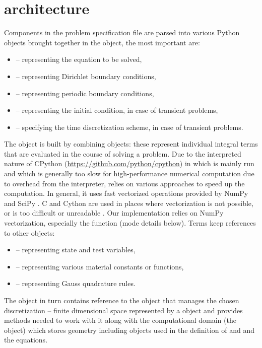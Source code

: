 \section{\sfepy{} architecture}
Components in the problem specification file are parsed into various
Python
objects
brought together in the  object, the most important
are:
\begin{itemize}
    \item {} -- representing the equation to be solved,
    \item {} -- representing Dirichlet boundary conditions,
    \item {} -- representing periodic boundary conditions,
    \item {} -- representing the initial condition, in case of
    transient problems,
    \item {} -- specifying the time discretization scheme, in case
    of transient problems.
\end{itemize}
The  object is built by combining 
objects: these represent individual integral terms that are evaluated in the course of
solving a problem. Due to the interpreted nature of CPython
(\url{https://github.com/python/cpython}) in which \sfepy{} is mainly run and which is
generally too slow for high-performance numerical computation due to overhead from the
interpreter, \sfepy{} relies on various approaches to speed up the computation. In
general, it uses fast vectorized operations provided by NumPy and SciPy
\cite{SciPy-NMeth2020}. C and Cython are used in places where vectorization is not
possible, or is too difficult or unreadable \cite{Cimrman_Lukes_Rohan_2019}. Our
implementation relies on NumPy vectorization, especially the  function (mode
details below). Terms keep references to other objects:
\begin{itemize}
    \item {} -- representing state and test variables,
    \item {} -- representing various material constants or functions,
    \item {} -- representing Gauss quadrature rules.
\end{itemize}
The  object in turn contains reference to the  object that
manages the chosen discretization -- finite dimensional space represented by
a  object and provides methods needed to work with it along with the
computational domain (the  object) which stores geometry
including  objects used in the definition of  and
 and the equations.
